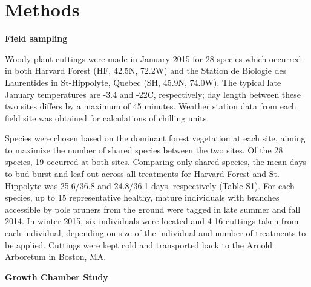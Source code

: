 \documentclass[11pt]{article}
\begin{document}



\section*{Methods}
\textbf{Field sampling}

Woody plant cuttings were made in January 2015 for 28 species which occurred in both Harvard Forest (HF, 42.5\degree N, 72.2\degree W) and the Station de Biologie des Laurentides in St-Hippolyte, Quebec (SH, 45.9\degree N, 74.0\degree W). The typical late January temperatures are -3.4 and -22\degree C, respectively; day length between these two sites differs by a maximum of 45 minutes. Weather station data from each field site was obtained for calculations of chilling units. 

Species were chosen based on the dominant forest vegetation at each site, aiming to maximize the number of shared species between the two sites. Of the 28 species, 19 occurred at both sites. Comparing only shared species, the mean days to bud burst and leaf out across all treatments for Harvard Forest and St. Hippolyte was 25.6/36.8 and 24.8/36.1 days, respectively (Table S1). For each species, up to 15 representative healthy, mature individuals with branches accessible by pole pruners from the ground were tagged in late summer and fall 2014. In winter 2015, six individuals were located and 4-16 cuttings taken from each individual, depending on size of the individual and number of treatments to be applied. Cuttings were kept cold and transported back to the Arnold Arboretum in Boston, MA.

\textbf{Growth Chamber Study}
\end{document}
